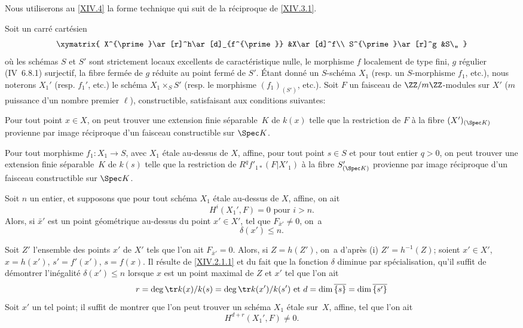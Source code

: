 Nous utiliserons au \numero \ref{XIV.4} la forme technique qui suit de la r\'eciproque de \ref{XIV.3.1}.

\begin{proposition} \label{XIV.3.5}
Soit un carr\'e cart\'esien
$$
\xymatrix{
X^{\prime}\ar[r]^h\ar[d]_{f^{\prime}} &X\ar[d]^f\\
S^{\prime}\ar[r]^g &S\,,
}
$$
o\`u les sch\'emas $S$ et $S'$ sont strictement locaux excellents de caract\'eristique nulle, le morphisme $f$ localement de type fini, $g$ r\'egulier (\textup{\EGA IV~6.8.1}) surjectif, la fibre ferm\'ee de $g$ r\'eduite au point ferm\'e de $S'$. \'Etant donn\'e un $S$-sch\'ema $X_1$ (resp. un $S$-morphisme $f_1$, etc.), nous noterons $X_1'$ (resp. $f_1'$, etc.) le sch\'ema $X_1 \times_S S'$ (resp. le morphisme $(f_1)_{(S')}$, etc.). Soit $F$ un faisceau de $\ZZ/m\ZZ$-modules sur $X'$ ($m$ puissance d'un nombre premier $\ell$), constructible, satisfaisant aux conditions suivantes:
\begin{enumeratei}
\item
Pour tout point $x \in X$, on peut trouver une extension finie s\'eparable~$K$ de $k(x)$ telle que la restriction de $F$ \`a la fibre $(X')_{(\Spec K)}$ provienne par image r\'eciproque d'un faisceau constructible sur $\Spec K$.
\item
Pour tout morphisme $f_1: X_1 \to S$, avec $X_1$ \'etale au-dessus de $X$, affine, pour tout point $s \in S$ et pour tout entier $q>0$, on peut trouver une extension finie s\'eparable~$K$ de $k(s)$ telle que la restriction de $R^q f'_{1*}(F|X'_1)$ \`a la fibre $S'_{(\Spec K)}$ provienne par image r\'eciproque d'un faisceau constructible sur $\Spec K$.
\end{enumeratei}

Soit $n$ un entier, et supposons que pour tout sch\'ema $X_1$ \'etale au-dessus de $X$, affine, on ait
$$
H^i(X_1', F)=0 \text{ pour } i>n.
$$
Alors, si $\bar{x}'$ est un point g\'eom\'etrique au-dessus du point $x' \in X'$, tel que $F_{\bar{x}'} \neq 0$, on~a
$$
\delta(x') \leq n.
$$
\end{proposition}

Soit $Z'$ l'ensemble des points $x'$ de $X'$ tels que l'on ait $F_{\bar{x}'} = 0$. Alors, si $Z=h(Z')$, on~a d'apr\`es \textup{(i)} $Z' = h^{-1}(Z)$; soient $x' \in X'$, $x=h(x')$, $s'=f'(x')$, $s=f(x)$. Il r\'esulte de \ref{XIV.2.1.1} et du fait que la fonction $\delta$ diminue par sp\'ecialisation, qu'il suffit de d\'emontrer l'in\'egalit\'e $\delta(x') \leq n$ lorsque $x$ est un point maximal de $Z$ et $x'$ tel que l'on ait
$$r=\deg \tr k(x)/k(s) = \deg \tr k(x')/k(s') \text{ et }d=\dim \overline{\{s\}} = \dim\overline{\{s'\}}$$
Soit $x'$ un tel point; il suffit de montrer que l'on peut trouver un sch\'ema $X_1$ \'etale sur~$X$, affine, tel que l'on ait
$$
H^{d+r}(X_1', F) \neq 0.
$$

